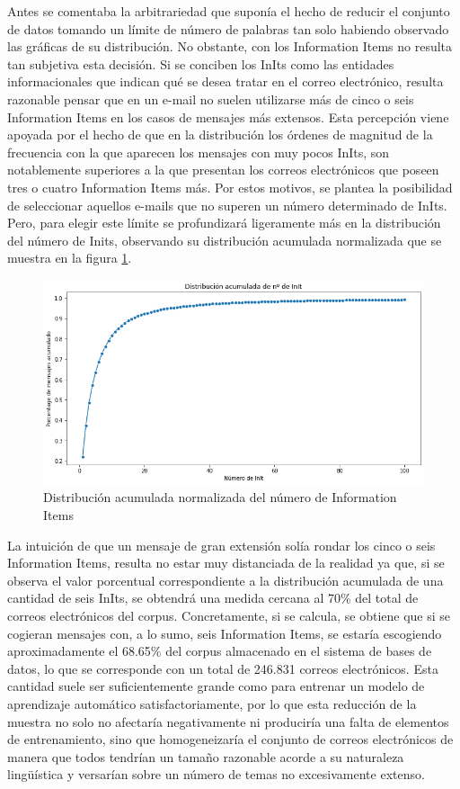 Antes se comentaba la arbitrariedad que suponía el hecho de reducir el conjunto de datos tomando un límite de número de palabras tan solo habiendo observado las gráficas de su distribución. No obstante, con los Information Items no resulta tan subjetiva esta decisión. Si se conciben los InIts como las entidades informacionales que indican qué se desea tratar en el correo electrónico, resulta razonable pensar que en un e-mail no suelen utilizarse más de cinco o seis Information Items en los casos de mensajes más extensos. Esta percepción viene apoyada por el hecho de que en la distribución los órdenes de magnitud de la frecuencia con la que aparecen los mensajes con muy pocos InIts, son notablemente superiores a la que presentan los correos electrónicos que poseen tres o cuatro Information Items más. Por estos motivos, se plantea la posibilidad de seleccionar aquellos e-mails que no superen un número determinado de InIts. Pero, para elegir este límite se profundizará ligeramente más en la distribución del número de Inits, observando su distribución acumulada normalizada que se muestra en la figura \ref{fig:acuminits}.

\begin{figure}[h]
	\centering%
	\centerline{\includegraphics[width = \textwidth]{Imagenes/Bitmap/miniacumporcinit.png}}%
	\caption{Distribución acumulada normalizada del número de Information Items}%
	\label{fig:acuminits}
\end{figure}

La intuición de que un mensaje de gran extensión solía rondar los cinco o seis Information Items, resulta no estar muy distanciada de la realidad ya que, si se observa el valor porcentual correspondiente a la distribución acumulada de una cantidad de seis InIts, se obtendrá una medida cercana al 70\% del total de correos electrónicos del corpus. Concretamente, si se calcula, se obtiene que si se cogieran mensajes con, a lo sumo, seis Information Items, se estaría escogiendo aproximadamente el 68.65\% del corpus almacenado en el sistema de bases de datos, lo que se corresponde con un total de 246.831 correos electrónicos. Esta cantidad suele ser suficientemente grande como para entrenar un modelo de aprendizaje automático satisfactoriamente, por lo que esta reducción de la muestra no solo no afectaría negativamente ni produciría una falta de elementos de entrenamiento, sino que homogeneizaría el conjunto de correos electrónicos de manera que todos tendrían un tamaño razonable acorde a su naturaleza lingüística y versarían sobre un número de temas no excesivamente extenso.

